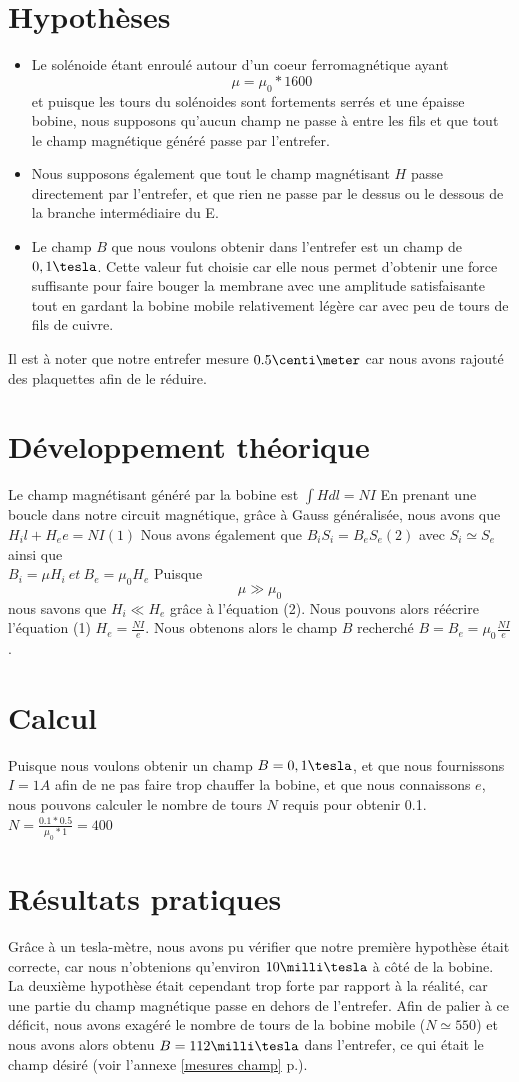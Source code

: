 \section{Hypothèses}
\begin{itemize}
\item Le solénoide étant enroulé autour d'un coeur ferromagnétique ayant \[\mu = \mu_0 * 1600\] et puisque les 
tours du solénoides sont fortements serrés et une épaisse bobine, nous supposons qu'aucun champ ne passe 
à entre les fils et que tout le champ magnétique généré passe par l'entrefer.
\item Nous supposons également que tout le champ magnétisant $H$ passe directement par l'entrefer, et que rien ne passe par 
le dessus ou le dessous de la branche intermédiaire du E.
\item Le champ $B$ que nous voulons obtenir dans l'entrefer est un champ de $0,1\tesla$. Cette valeur fut choisie car elle nous permet d'obtenir une force suffisante pour faire bouger la membrane avec une amplitude satisfaisante tout en gardant la bobine 
mobile relativement légère car avec peu de tours de fils de cuivre.
\end{itemize}
Il est à noter que notre entrefer mesure $0.5\centi\meter$ car nous avons rajouté des plaquettes afin de le réduire.
\section{Développement théorique}
Le champ magnétisant généré par la bobine est 
$\int{H dl} = N I$
En prenant une boucle dans notre circuit magnétique, grâce à Gauss généralisée, nous avons que
$H_i l + H_e e = N I (1)$
Nous avons également que $B_i S_i = B_e S_e (2)$  avec $S_i \simeq S_e$
ainsi que \\
$B_i = \mu H_i \:et\:  B_e = \mu_0 H_e$
Puisque \[\mu \gg \mu_0\]nous savons que $H_i \ll H_e$ grâce à l'équation (2).
Nous pouvons alors réécrire l'équation (1) $H_e = \frac{N I}{e}$.
Nous obtenons alors le champ $B$ recherché $B = B_e = \mu_0 \frac{N I}{e}$.
\section{Calcul}
Puisque nous voulons obtenir un champ $B = 0,1 \tesla$, et que nous fournissons $I = 1 A$ afin de ne pas faire trop 
chauffer la bobine, et que nous connaissons $e$, nous pouvons calculer le nombre de tours $N$ requis pour obtenir 0.1\tesla.
$N = \frac{0.1 * 0.5}{\mu_0 * 1} = 400$
\section{Résultats pratiques}
Grâce à un tesla-mètre, nous avons pu vérifier que notre première hypothèse était correcte, car nous n'obtenions 
qu'environ $10 \milli\tesla$ à côté de la bobine. 
\\La deuxième hypothèse était cependant trop forte par rapport à la réalité, car une 
partie du champ magnétique passe en dehors de l'entrefer. Afin de palier à ce déficit, nous avons exagéré le nombre de 
tours de la bobine mobile ($N \simeq 550$) et nous avons alors obtenu $B = 112 \milli\tesla$ dans l'entrefer, 
ce qui était le champ désiré (voir l'annexe \ref{mesures champ} p.\pageref{mesures champ}).
